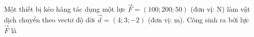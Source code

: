\begin{ex}
Một thiết bị kéo hàng tác dụng một lực $\overrightarrow{F}=(100;200;50)$ (đơn vị: N) làm vật dịch chuyển theo vectơ độ dời $\vec{d}=(4;3;-2)$ (đơn vị: m). Công sinh ra bởi lực $\overrightarrow{F}$ là
\end{ex}
